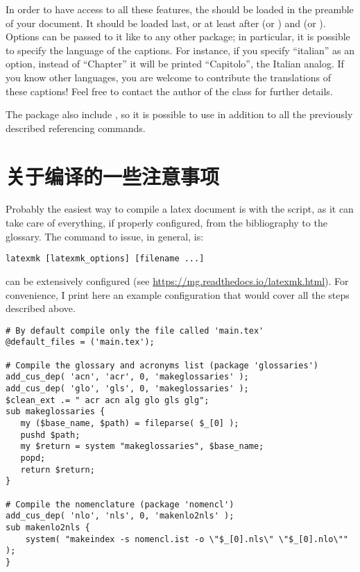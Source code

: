 In order to have access to all these features, the 
should be loaded in the preamble of your document. It should be loaded
last, or at least after  (or ) and
 (or ). Options can be
passed to it like to any other package; in particular, it is possible to
specify the language of the captions. For instance, if you specify
\enquote{italian} as an option, instead of \enquote{Chapter} it will be
printed \enquote{Capitolo}, the Italian analog. If you know other
languages, you are welcome to contribute the translations of these
captions! Feel free to contact the author of the class for further
details.

The  package also include , so it is
possible to use  in addition to all the previously
described referencing commands.

\section{关于编译的一些注意事项}

Probably the easiest way to compile a latex document is with the
 script, as it can take care of everything, if properly
configured, from the bibliography to the glossary. The command to issue,
in general, is:

\begin{lstlisting}
latexmk [latexmk_options] [filename ...]
\end{lstlisting}

 can be extensively configured (see
\url{https://mg.readthedocs.io/latexmk.html}). For convenience, I print
here an example configuration that would cover all the steps described
above.

\begin{lstlisting}
# By default compile only the file called 'main.tex'
@default_files = ('main.tex');

# Compile the glossary and acronyms list (package 'glossaries')
add_cus_dep( 'acn', 'acr', 0, 'makeglossaries' );
add_cus_dep( 'glo', 'gls', 0, 'makeglossaries' );
$clean_ext .= " acr acn alg glo gls glg";
sub makeglossaries {
   my ($base_name, $path) = fileparse( $_[0] );
   pushd $path;
   my $return = system "makeglossaries", $base_name;
   popd;
   return $return;
}

# Compile the nomenclature (package 'nomencl')
add_cus_dep( 'nlo', 'nls', 0, 'makenlo2nls' );
sub makenlo2nls {
    system( "makeindex -s nomencl.ist -o \"$_[0].nls\" \"$_[0].nlo\"" );
}
\end{lstlisting}

